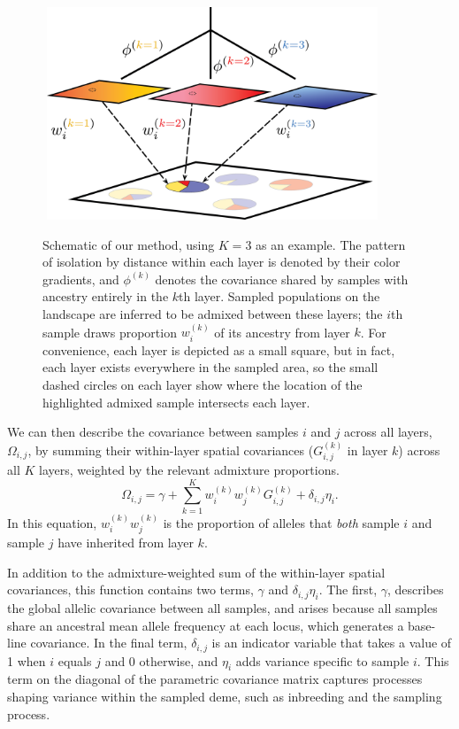 \documentclass[10pt,letterpaper]{article}
\begin{document}
\begin{figure}
	\centering
		{\includegraphics[width=4in,height=2.5in]{figs/schematic/method_schematic.png}}
		\caption{Schematic of our method, using $K=3$ as an example.
			     The pattern of isolation by distance within each layer is denoted by their color gradients, 
			     and $\phi^{(k)}$ denotes the covariance shared by samples with ancestry entirely in the $k$th layer.
			     Sampled populations on the landscape are inferred to be admixed between these layers; 
			     the $i$th sample draws proportion $w^{(k)}_i$ of its ancestry from layer $k$.
			     For convenience, each layer is depicted as a small square, but in fact, 
			     each layer exists everywhere in the sampled area,
			     so the small dashed circles on each layer show where 
			     the location of the highlighted admixed sample intersects each layer.
			    }\label{schematic}
\end{figure}

We can then describe the covariance between samples $i$ and $j$ across all layers, $\Omega_{i,j}$,
by summing their within-layer spatial covariances ($G_{i,j}^{(k)}$ in layer $k$) across all $K$ layers,
weighted by the relevant admixture proportions.
\begin{equation}
    \Omega_{i,j} = \gamma + \sum_{k=1}^K w^{(k)}_i w^{(k)}_j
G^{(k)}_{i,j} + \delta_{i,j}\eta_i .
\label{cross_layer_covariance}
\end{equation}
In this equation, $w^{(k)}_i w^{(k)}_j$ is the proportion of alleles that \emph{both}
sample $i$ and sample $j$ have inherited from layer $k$.

In addition to the admixture-weighted sum of the within-layer spatial covariances,
this function contains two terms, $\gamma$ and $\delta_{i,j}\eta_i$.
The first, $\gamma$, describes the global allelic covariance between all samples, 
and arises because all samples share an ancestral mean allele frequency at each locus,
which generates a base-line covariance.
In the final term, $\delta_{i,j}$ is an indicator variable that takes a value of 1 when $i$ equals $j$ and 0 otherwise,
and $\eta_i$ adds variance specific to sample $i$.
This term on the diagonal of the parametric covariance matrix captures processes shaping variance within the sampled deme, 
such as inbreeding and the sampling process.
\end{document}
